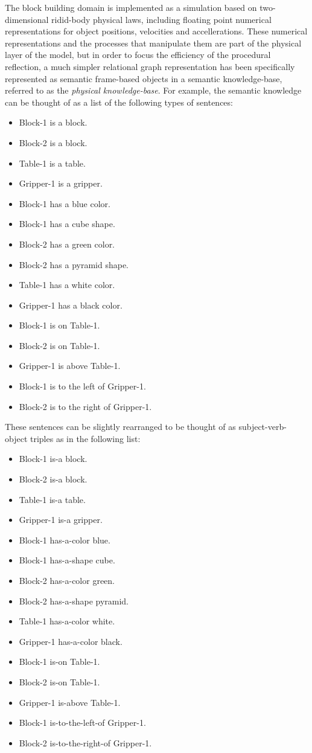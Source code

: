 The block building domain is implemented as a simulation based on
two-dimensional ridid-body physical laws, including floating point
numerical representations for object positions, velocities and
accellerations.  These numerical representations and the processes
that manipulate them are part of the physical layer of the model, but
in order to focus the efficiency of the procedural reflection, a much
simpler relational graph representation has been specifically
represented as semantic frame-based objects in a semantic
knowledge-base, referred to as the \emph{physical knowledge-base}.
For example, the semantic knowledge can be thought of as a list of the
following types of sentences:
\begin{itemize}
\item Block-1 is a block.
\item Block-2 is a block.
\item Table-1 is a table.
\item Gripper-1 is a gripper.
\item Block-1 has a blue color.
\item Block-1 has a cube shape.
\item Block-2 has a green color.
\item Block-2 has a pyramid shape.
\item Table-1 has a white color.
\item Gripper-1 has a black color.
\item Block-1 is on Table-1.
\item Block-2 is on Table-1.
\item Gripper-1 is above Table-1.
\item Block-1 is to the left of Gripper-1.
\item Block-2 is to the right of Gripper-1.
\end{itemize}
These sentences can be slightly rearranged to be thought of as
subject-verb-object triples as in the following list:
\begin{itemize}
\item Block-1 is-a block.
\item Block-2 is-a block.
\item Table-1 is-a table.
\item Gripper-1 is-a gripper.
\item Block-1 has-a-color blue.
\item Block-1 has-a-shape cube.
\item Block-2 has-a-color green.
\item Block-2 has-a-shape pyramid.
\item Table-1 has-a-color white.
\item Gripper-1 has-a-color black.
\item Block-1 is-on Table-1.
\item Block-2 is-on Table-1.
\item Gripper-1 is-above Table-1.
\item Block-1 is-to-the-left-of Gripper-1.
\item Block-2 is-to-the-right-of Gripper-1.
\end{itemize}

